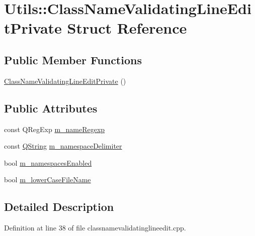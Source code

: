 \hypertarget{struct_utils_1_1_class_name_validating_line_edit_private}{\section{Utils\-:\-:Class\-Name\-Validating\-Line\-Edit\-Private Struct Reference}
\label{struct_utils_1_1_class_name_validating_line_edit_private}
}
\subsection*{Public Member Functions}
\begin{DoxyCompactItemize}
\item 
\hyperlink{struct_utils_1_1_class_name_validating_line_edit_private_a37cb7e6677b13d031aff6103b1abb3ce}{Class\-Name\-Validating\-Line\-Edit\-Private} ()
\end{DoxyCompactItemize}
\subsection*{Public Attributes}
\begin{DoxyCompactItemize}
\item 
const Q\-Reg\-Exp \hyperlink{struct_utils_1_1_class_name_validating_line_edit_private_a3b1964b13bc15a3ae11f83e12942fd99}{m\-\_\-name\-Regexp}
\item 
const \hyperlink{group___u_a_v_objects_plugin_gab9d252f49c333c94a72f97ce3105a32d}{Q\-String} \hyperlink{struct_utils_1_1_class_name_validating_line_edit_private_a83c2d2b3c70dd5300a1bc57e518ed3d5}{m\-\_\-namespace\-Delimiter}
\item 
bool \hyperlink{struct_utils_1_1_class_name_validating_line_edit_private_aac53edaa6749894e449523e8d60c5ec1}{m\-\_\-namespaces\-Enabled}
\item 
bool \hyperlink{struct_utils_1_1_class_name_validating_line_edit_private_a2f28084151e090c3dadfe1d2749fa0a6}{m\-\_\-lower\-Case\-File\-Name}
\end{DoxyCompactItemize}


\subsection{Detailed Description}


Definition at line 38 of file classnamevalidatinglineedit.\-cpp.



